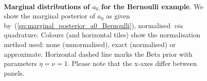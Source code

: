\documentclass[a4paper, notitlepage, 11pt]{article}
\begin{document}
\begin{figure}[!ht]
\begin{center}
 \hfill
{}
\hfill
{}\\
\hfill
{}
\hfill
{}
\hfill
\end{center}
\caption{\textbf{Marginal distributions of $a_0$ for the Bernoulli example}.
We show the marginal posterior of $a_0$ as given by~(\ref{eq:marginal_posterior_a0_Bernoulli}), normalised~\textit{via} quadrature.
Colours (and horizontal tiles) show the normalisation method used: none (unnormalised), exact (normalised) or approximate.
Horizontal dashed line marks the Beta prior with parameters $\eta = \nu = 1$.
Please note that the x-axes differ between panels.
}
\label{fig:marginal_a0_Bernoulli}
\end{figure}
\end{document}
